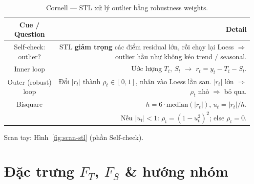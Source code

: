 \documentclass[12pt,a4paper]{article}
\newcommand{\cornellhead}{%
  \toprule
  \textbf{Cue / Question} & \textbf{Detail} \\
  \midrule
}
\begin{document}
\begin{table}[H]
  \centering
  \caption{Cornell --- STL xử lý outlier bằng robustness weights.}
  \label{tab:cornell-robust}
  \small
  \begin{tabularx}{\textwidth}{@{}CD@{}}
    \cornellhead
    Self-check: outlier? &
    STL \textbf{giảm trọng} các điểm residual lớn, rồi chạy lại Loess
    $\Rightarrow$ outlier hầu như không kéo trend / seasonal. \\
    \addlinespace
    Inner loop          &
    Ước lượng \(T_t\), \(S_t\) $\to$
    \(r_t = y_t - T_t - S_t\). \\
    \addlinespace
    Outer (robust) loop &
    Đổi \(|r_t|\) thành \(\rho_t \in [0,1]\), nhân vào Loess lần sau.
    \(|r_t|\) lớn $\Rightarrow$ \(\rho_t\) nhỏ $\Rightarrow$ bỏ qua. \\
    \addlinespace
    Bisquare            &
    \(h = 6\cdot\mathrm{median}(|r_t|)\), \(u_t = |r_t|/h\). \\
                        & Nếu \(|u_t|<1\): \(\rho_t = (1-u_t^2)^2\); else \(\rho_t=0\). \\
    \bottomrule
  \end{tabularx}
\end{table}

\noindent Scan tay: Hình~\ref{fig:scan-stl} (phần Self-check).

\section{\texorpdfstring{Đặc trưng \(F_T\), \(F_S\) \& hướng nhóm}{Đặc trưng FT, FS \& hướng nhóm}}
\end{document}
